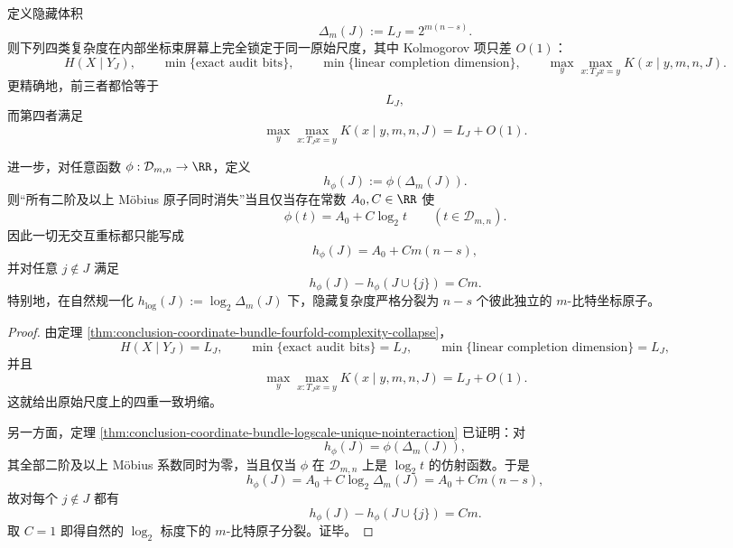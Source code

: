 \begin{theorem}[隐藏复杂度的原子可积化与对数标度唯一性]\label{thm:conclusion-coordinatebundle-atomic-integrability-logscale}
定义隐藏体积
\[
\Delta_m(J):=L_J=2^{m(n-s)}.
\]
则下列四类复杂度在内部坐标束屏幕上完全锁定于同一原始尺度，其中 Kolmogorov 项只差 \(O(1)\)：
\[
H(X\mid Y_J),
\qquad
\min\{\text{exact audit bits}\},
\qquad
\min\{\text{linear completion dimension}\},
\qquad
\max_{y}\max_{x:T_Jx=y}K(x\mid y,m,n,J).
\]
更精确地，前三者都恰等于
\[
L_J,
\]
而第四者满足
\[
\max_{y}\max_{x:T_Jx=y}K(x\mid y,m,n,J)=L_J+O(1).
\]

进一步，对任意函数 \(\phi:\mathcal D_{m,n}\to\RR\)，定义
\[
h_\phi(J):=\phi(\Delta_m(J)).
\]
则“所有二阶及以上 Möbius 原子同时消失”当且仅当存在常数 \(A_0,C\in\RR\) 使
\[
\phi(t)=A_0+C\log_2 t
\qquad
(t\in \mathcal D_{m,n}).
\]
因此一切无交互重标都只能写成
\[
h_\phi(J)=A_0+Cm(n-s),
\]
并对任意 \(j\notin J\) 满足
\[
h_\phi(J)-h_\phi(J\cup\{j\})=Cm.
\]
特别地，在自然规一化 \(h_{\log}(J):=\log_2\Delta_m(J)\) 下，隐藏复杂度严格分裂为 \(n-s\) 个彼此独立的 \(m\)-比特坐标原子。
\end{theorem}
\begin{proof}
由定理 \ref{thm:conclusion-coordinate-bundle-fourfold-complexity-collapse}，
\[
H(X\mid Y_J)=L_J,
\qquad
\min\{\text{exact audit bits}\}=L_J,
\qquad
\min\{\text{linear completion dimension}\}=L_J,
\]
并且
\[
\max_{y}\max_{x:T_Jx=y}K(x\mid y,m,n,J)=L_J+O(1).
\]
这就给出原始尺度上的四重一致坍缩。

另一方面，定理 \ref{thm:conclusion-coordinate-bundle-logscale-unique-nointeraction} 已证明：对
\[
h_\phi(J)=\phi(\Delta_m(J)),
\]
其全部二阶及以上 Möbius 系数同时为零，当且仅当 \(\phi\) 在 \(\mathcal D_{m,n}\) 上是 \(\log_2 t\) 的仿射函数。于是
\[
h_\phi(J)=A_0+C\log_2\Delta_m(J)=A_0+Cm(n-s),
\]
故对每个 \(j\notin J\) 都有
\[
h_\phi(J)-h_\phi(J\cup\{j\})=Cm.
\]
取 \(C=1\) 即得自然的 \(\log_2\) 标度下的 \(m\)-比特原子分裂。证毕。
\end{proof}

